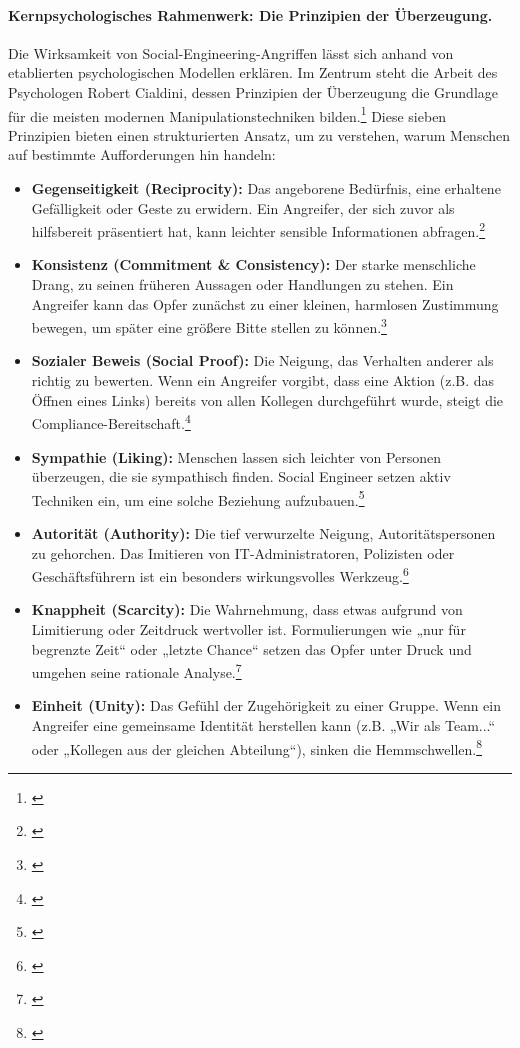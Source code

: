 \documentclass[10pt,a4paper]{article}
\begin{document}
	\paragraph{Kernpsychologisches Rahmenwerk: Die Prinzipien der Überzeugung.}
	Die Wirksamkeit von Social-Engineering-Angriffen lässt sich anhand von etablierten psychologischen Modellen erklären. Im Zentrum steht die Arbeit des Psychologen Robert Cialdini, dessen Prinzipien der Überzeugung die Grundlage für die meisten modernen Manipulationstechniken bilden.\footnote{\cite{CialdiniPrinciples}} Diese sieben Prinzipien bieten einen strukturierten Ansatz, um zu verstehen, warum Menschen auf bestimmte Aufforderungen hin handeln:
	\begin{itemize}
		\item \textbf{Gegenseitigkeit (Reciprocity):} Das angeborene Bedürfnis, eine erhaltene Gefälligkeit oder Geste zu erwidern. Ein Angreifer, der sich zuvor als hilfsbereit präsentiert hat, kann leichter sensible Informationen abfragen.\footnote{\cite{SwissCSC}}
		\item \textbf{Konsistenz (Commitment \& Consistency):} Der starke menschliche Drang, zu seinen früheren Aussagen oder Handlungen zu stehen. Ein Angreifer kann das Opfer zunächst zu einer kleinen, harmlosen Zustimmung bewegen, um später eine größere Bitte stellen zu können.\footnote{\cite{HSUAugsburg}}
		\item \textbf{Sozialer Beweis (Social Proof):} Die Neigung, das Verhalten anderer als richtig zu bewerten. Wenn ein Angreifer vorgibt, dass eine Aktion (z.B. das Öffnen eines Links) bereits von allen Kollegen durchgeführt wurde, steigt die Compliance-Bereitschaft.\footnote{\cite{SwissCSC}}
		\item \textbf{Sympathie (Liking):} Menschen lassen sich leichter von Personen überzeugen, die sie sympathisch finden. Social Engineer setzen aktiv Techniken ein, um eine solche Beziehung aufzubauen.\footnote{\cite{SwissCSC}}
		\item \textbf{Autorität (Authority):} Die tief verwurzelte Neigung, Autoritätspersonen zu gehorchen. Das Imitieren von IT-Administratoren, Polizisten oder Geschäftsführern ist ein besonders wirkungsvolles Werkzeug.\footnote{\cite{HSUAugsburg}}
		\item \textbf{Knappheit (Scarcity):} Die Wahrnehmung, dass etwas aufgrund von Limitierung oder Zeitdruck wertvoller ist. Formulierungen wie „nur für begrenzte Zeit“ oder „letzte Chance“ setzen das Opfer unter Druck und umgehen seine rationale Analyse.\footnote{\cite{HSUAugsburg}}
		\item \textbf{Einheit (Unity):} Das Gefühl der Zugehörigkeit zu einer Gruppe. Wenn ein Angreifer eine gemeinsame Identität herstellen kann (z.B. „Wir als Team...“ oder „Kollegen aus der gleichen Abteilung“), sinken die Hemmschwellen.\footnote{\cite{HSUAugsburg}}
	\end{itemize}
	
\end{document}
